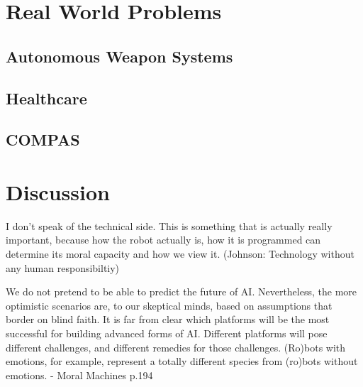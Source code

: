 \documentclass{article}
\newcounter{example}
\begin{document}
%
%
%
%

\section{Real World Problems}
\subsection{Autonomous Weapon Systems}
\subsection{Healthcare}
\subsection{COMPAS}
\section{Discussion}

I don't speak of the technical side. This is something that is actually really
important, because how the robot actually is, how it is programmed can determine
its moral capacity and how we view it. (Johnson: Technology without any human
responsibiltiy)


We do not pretend to be able to predict the future of AI. Nevertheless, the 
more optimistic scenarios are, to our skeptical minds, based on assumptions 
that border on blind faith. It is far from clear which platforms will be the most 
successful for building advanced forms of AI. Different platforms will pose 
different challenges, and different remedies for those challenges. (Ro)bots 
with emotions, for example, represent a totally different species from (ro)bots 
without emotions. - Moral Machines p.194
\end{document}
